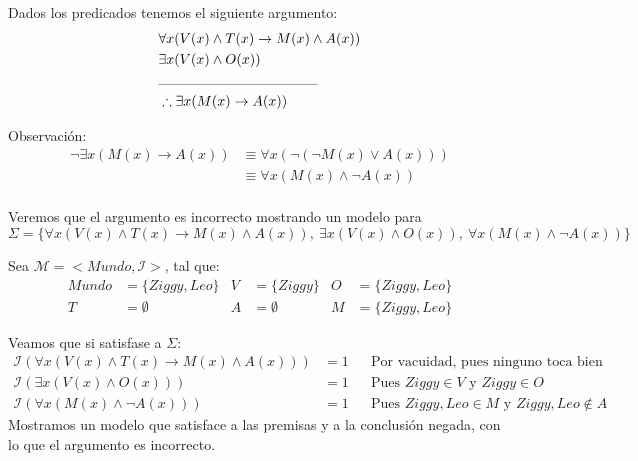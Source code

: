 \documentclass[8pt, letterpaper]{article}
\newcommand{\m}{\mathcal{M} }
\newcommand{\I}{\mathcal{I} }
\begin{document}
\begin{enumerate}
  Dados los predicados tenemos el siguiente argumento:
  \begin{align*}
    &\forall x(V(x)\land T(x)\rightarrow M(x)\land A(x)) \\
    &\exists x(V(x)\land O(x))\\
    &\text{\rule{4cm}{0.01cm}}\\
    &\therefore \exists x(M(x)\rightarrow A(x))
  \end{align*}

  Observación:
  \begin{align*}
    \neg \exists x(M(x)\rightarrow A(x)) &\equiv \forall x(\neg(\neg M(x)\lor A(x)))\\
    &\equiv \forall x(M(x)\land \neg A(x))\\
  \end{align*}

  Veremos que el argumento es incorrecto mostrando un modelo para
  $$\Sigma = \{\forall x(V(x)\land T(x)\rightarrow M(x)\land A(x)),\
  \exists x(V(x)\land O(x)),\ \forall x(M(x)\land \neg A(x))\}$$

  Sea $\m = <Mundo, \I>$, tal que:
  \begin{align*}
    Mundo &= \{ Ziggy, Leo\} & V &= \{Ziggy\} & O &= \{Ziggy, Leo\}\\
    T &= \emptyset & A &= \emptyset & M &= \{Ziggy, Leo\}
  \end{align*}

  Veamos que si satisfase a $\Sigma$:
  \begin{align*}
    \I(\forall x(V(x)\land T(x)\rightarrow M(x)\land A(x))) &= 1 &
    &\text{Por vacuidad, pues ninguno toca bien}\\
    \I(\exists x(V(x)\land O(x))) &= 1 & &\text{Pues $Ziggy\in V$ y
      $Ziggy\in O$} \\
    \I(\forall x(M(x)\land \neg A(x))) &= 1 & &\text{Pues
      $Ziggy, Leo\in M$ y $Ziggy, Leo\notin A$}
  \end{align*}
  Mostramos un modelo que satisface a las premisas y a la conclusión negada,
  con lo que el argumento es incorrecto.
\end{enumerate}
\end{document}
